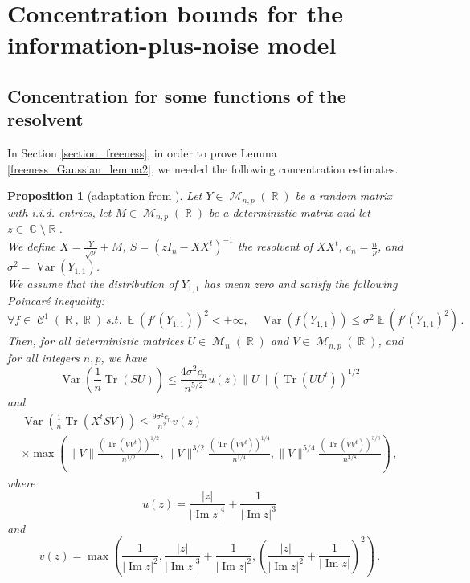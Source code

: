 \documentclass[11pt,a4paper]{article}
\DeclareMathOperator{\E}{\mathbb{E}}
\DeclareMathOperator{\R}{\mathbb{R}}
\DeclareMathOperator{\C}{\mathbb{C}}
\DeclareMathOperator{\CC}{\mathcal{C}}
\DeclareMathOperator{\MM}{\mathcal{M}}
\DeclareMathOperator{\1}{\mathbf{1}}
\DeclareMathOperator{\Imag}{\mathrm{Im}}
\DeclareMathOperator{\Var}{\mathrm{Var}}
\DeclareMathOperator{\Tr}{\mathrm{Tr}}
\newtheorem{Proposition}{Proposition}[section]
\theoremstyle{definition}
\begin{document}
\appendix


\section{Concentration bounds for the information-plus-noise model} \label{appendix_concentration}

\subsection{Concentration for some functions of the resolvent}

In Section \ref{section_freeness}, in order to prove Lemma \ref{freeness_Gaussian_lemma2}, we needed the following concentration estimates.

\begin{Proposition}[adaptation from {\cite[Lemma 8]{VLM}}] \label{concentration1-2}
Let $Y \in \MM_{n,p}(\R)$ be a random matrix with i.i.d. entries, let $M \in \MM_{n,p}(\R)$ be a deterministic matrix and let $z \in \C \setminus \R$.\\
We define $X = \frac{Y}{\sqrt{p}}+M$, $S=(zI_n-XX^t)^{-1}$ the resolvent of $XX^t$, $c_n = \frac{n}{p}$, and $\sigma^2 = \Var(Y_{1,1})$.\\
We assume that the distribution of $Y_{1,1}$ has mean zero and satisfy the following Poincar\'e inequality:
\begin{displaymath}
\forall f \in \CC^1(\R,\R) \ s.t. \ \E(f'(Y_{1,1}))^2 < +\infty , \quad \Var(f(Y_{1,1})) \le \sigma^2 \E(f'(Y_{1,1})^2) \, .
\end{displaymath}
Then, for all deterministic matrices $U \in \MM_n(\R)$ and $V \in \MM_{n,p}(\R)$, and for all integers $n,p$, we have
\begin{equation} \label{concentration1}
\Var \left( \frac1n \Tr(SU) \right) \le \frac{4 \sigma^2 c_n}{n^{5/2}} u(z) \|U\| (\Tr(UU^t))^{1/2}
\end{equation}
and
\begin{multline} \label{concentration2bis}
\Var \left( \frac1n \Tr(X^tSV) \right) \le \frac{9 \sigma^2 c_n}{n^2} v(z) \\
\times \max \left( \|V\| \frac{(\Tr(VV^t))^{1/2}}{n^{1/2}} , \|V\|^{3/2} \frac{(\Tr(VV^t))^{1/4}}{n^{1/4}} , \|V\|^{5/4} \frac{(\Tr(VV^t))^{3/8}}{n^{3/8}} \right) \, ,
\end{multline}
where
\begin{displaymath}
u(z) = \frac{|z|}{|\Imag z|^4} + \frac{1}{|\Imag z|^3}
\end{displaymath}
and
\begin{displaymath}
v(z) = \max \left( \frac{1}{|\Imag z|^2} , \frac{|z|}{|\Imag z|^3} + \frac{1}{|\Imag z|^2} , \left( \frac{|z|}{|\Imag z|^2} + \frac{1}{|\Imag z|} \right)^2 \right) \, .
\end{displaymath}
\end{Proposition}
\end{document}
